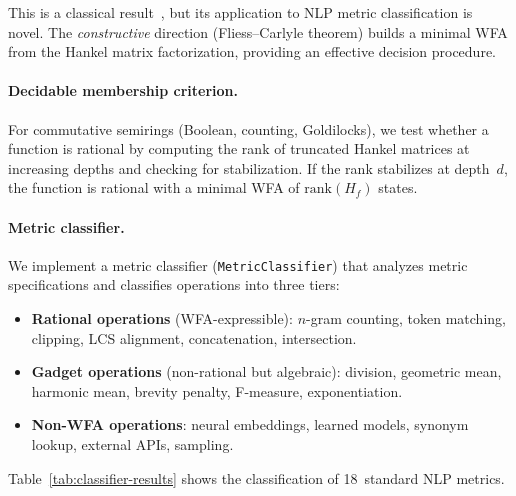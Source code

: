 \documentclass[11pt]{article}
\begin{document}
\noindent This is a classical result~\cite{schutzenberger1961,berstel2011noncommutative},
but its application to NLP metric classification is novel.  The
\emph{constructive} direction (Fliess--Carlyle theorem) builds a
minimal WFA from the Hankel matrix factorization, providing an
effective decision procedure.

\paragraph{Decidable membership criterion.}
For commutative semirings (Boolean, counting, Goldilocks), we test
whether a function is rational by computing the rank of truncated
Hankel matrices at increasing depths and checking for stabilization.
If the rank stabilizes at depth~$d$, the function is rational with
a minimal WFA of $\mathrm{rank}(H_f)$ states.

\paragraph{Metric classifier.}
We implement a metric classifier (\texttt{MetricClassifier}) that
analyzes metric specifications and classifies operations into three tiers:
\begin{itemize}[nosep]
\item \textbf{Rational operations} (WFA-expressible): $n$-gram counting,
  token matching, clipping, LCS alignment, concatenation, intersection.
\item \textbf{Gadget operations} (non-rational but algebraic): division,
  geometric mean, harmonic mean, brevity penalty, F-measure, exponentiation.
\item \textbf{Non-WFA operations}: neural embeddings, learned models,
  synonym lookup, external APIs, sampling.
\end{itemize}

\noindent Table~\ref{tab:classifier-results} shows the classification of
18~standard NLP metrics.
\end{document}
